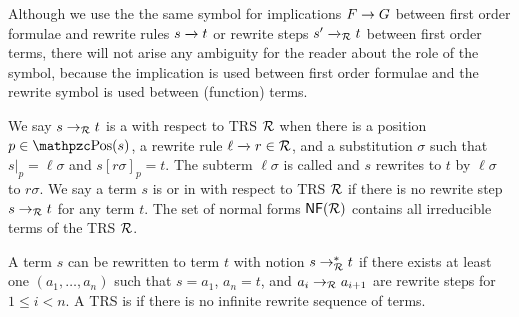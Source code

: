 Although we use the the same symbol for implications \( F\rightarrow G \) between first order formulae
and rewrite rules \( s\xrightarrow[{}]{} t \) or rewrite steps \( s'\xrightarrow[{}]{}_{\mathcal{R}} t \) between first order terms,
there will not arise any ambiguity for the reader about the role of the symbol,
because the implication is used between first order formulae
and the rewrite symbol is used between (function) terms.

%
\begin{definition}
	We say \( s\rightarrow_{\mathcal{R}} t \) is a
	 with respect to TRS \( \mathcal{R} \)
	when there is a position \( p \in \pos(s) \),
	a rewrite rule \( \ell\xrightarrow[{}]{} r\in\mathcal{R} \),
	and a substitution \( \sigma \) such that
	\( s|_p=\ell\sigma \) and \( s{[r\sigma]}_p = t \).
		The subterm \( \ell\sigma \) is called  and
	\( s \) rewrites to \( t \) by  \( \ell\sigma \) to  \( r\sigma \).
	We say a term \( s \) is  or in  with respect to TRS \( \mathcal{R} \) if there is no rewrite step \( s\rightarrow_{\mathcal{R}} t \) for any term \( t \).
	The set of normal forms \( \mathsf{NF} (\mathcal{R}) \) contains all irreducible terms of the TRS \( \mathcal{R} \).

	\end{definition}
%
%
\begin{definition}
	A term \( s \) can be rewritten to term \( t \) with notion \( s\rightarrow^*_{\mathcal{R}} t \)
	if there exists at least one  \( (a_1,\ldots ,a_n) \) such that
	\( s=a_1 \), \( a_n=t \), and \( a_i\rightarrow_{\mathcal{R}} a_{i+1} \) are rewrite steps for \( 1\leq i<n \).
	A TRS is  if there is no infinite rewrite sequence of terms.
\end{definition}
